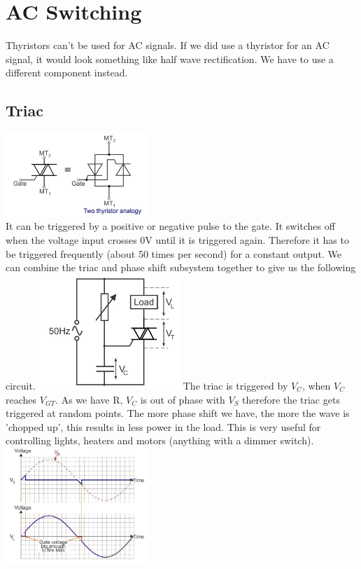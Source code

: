 \documentclass[a4paper, 11pt, twocolumn]{article}
\begin{document}
    \section{AC Switching}
    Thyristors can't be used for AC signals. If we did use a thyristor for an AC signal, it would look something like half wave rectification. We have to use a different component instead.
    \subsection{Triac}
    \includegraphics[width=0.4\textwidth]{triac.jpg}\\
    It can be triggered by a positive or negative pulse to the gate. It switches off when the voltage input crosses 0V until it is triggered again. Therefore it has to be triggered frequently (about 50 times per second) for a constant output.\newline
    We can combine the triac and phase shift subsystem together to give us the following circuit.\newline
    \includegraphics[width=0.4\textwidth]{triacAnd PhaseShift.jpg}\newline
    The triac is triggered by $V_C$, when $V_C$ reaches $V_{GT}$. As we have R, $V_C$ is out of phase with $V_S$ therefore the triac gets triggered at random points.\newline
    The more phase shift we have, the more the wave is 'chopped up', this results in less power in the load. This is very useful for controlling lights, heaters and motors (anything with a dimmer switch).\newline
    \includegraphics[width=0.4\textwidth]{triacOut.jpg}
\end{document}
